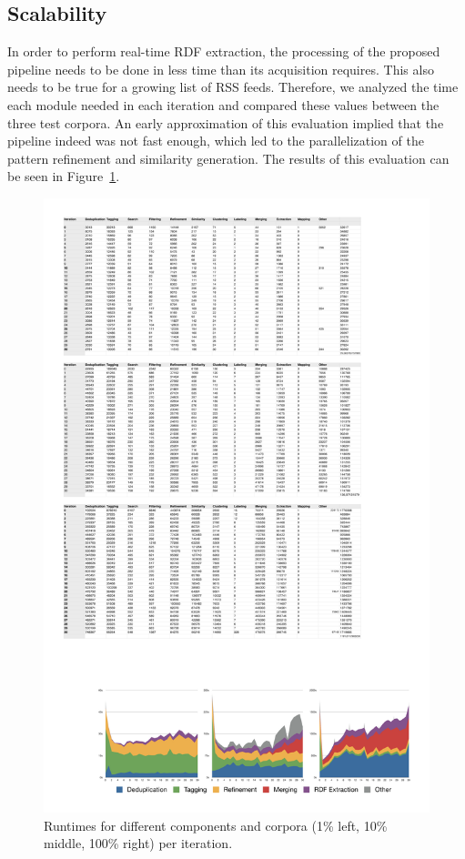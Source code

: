 \documentclass[a4paper]{llncs}
\begin{document}
\subsection{Scalability}
In order to perform real-time RDF extraction, the processing of the proposed pipeline needs to be done in less time than its acquisition requires.
This also needs to be true for a growing list of RSS feeds.
Therefore, we analyzed the time each module needed in each iteration and compared these values between the three test corpora.
An early approximation of this evaluation implied that the pipeline indeed was not fast enough, which led to the parallelization of the pattern refinement and similarity generation. 
The results of this evaluation can be seen in Figure~\ref{fig:speed}.
\begin{figure}[tb]
	\begin{center}
		\includegraphics[width=\textwidth]{images/speed.pdf}
	\end{center}
	\caption{Runtimes for different components and corpora (1\% left, 10\% middle, 100\% right) per iteration.}
	\label{fig:speed}
\end{figure}
\end{document}
